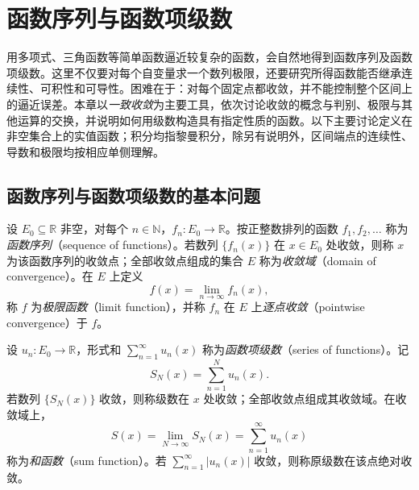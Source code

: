 \setcounter{chapter}{9} %
\chapter{函数序列与函数项级数}
\label{chap:function-sequences-and-series}

用多项式、三角函数等简单函数逼近较复杂的函数，会自然地得到函数序列及函数项级数。这里不仅要对每个自变量求一个数列极限，还要研究所得函数能否继承连续性、可积性和可导性。困难在于：对每个固定点都收敛，并不能控制整个区间上的逼近误差。本章以\emph{一致收敛}为主要工具，依次讨论收敛的概念与判别、极限与其他运算的交换，并说明如何用级数构造具有指定性质的函数。以下主要讨论定义在非空集合上的实值函数；积分均指黎曼积分，除另有说明外，区间端点的连续性、导数和极限均按相应单侧理解。

\section{函数序列与函数项级数的基本问题}
\label{sec:basic-problems-of-function-sequences-and-series}

\begin{definition}
\label{def:pointwise-function-sequence-convergence}
设 $E_0\subseteq\mathbb R$ 非空，对每个 $n\in\mathbb N$，$f_n:E_0\to\mathbb R$。按正整数排列的函数 $f_1,f_2,\ldots$ 称为\emph{函数序列}（sequence of functions）。若数列 $\{f_n(x)\}$ 在 $x\in E_0$ 处收敛，则称 $x$ 为该函数序列的收敛点；全部收敛点组成的集合 $E$ 称为\emph{收敛域}（domain of convergence）。在 $E$ 上定义
\[
    f(x)=\lim_{n\to\infty}f_n(x),
\]
称 $f$ 为\emph{极限函数}（limit function），并称 $f_n$ 在 $E$ 上\emph{逐点收敛}（pointwise convergence）于 $f$。
\end{definition}

\begin{definition}
\label{def:function-series-and-sum-function}
设 $u_n:E_0\to\mathbb R$，形式和 $\sum_{n=1}^\infty u_n(x)$ 称为\emph{函数项级数}（series of functions）。记
\[
    S_N(x)=\sum_{n=1}^N u_n(x).
\]
若数列 $\{S_N(x)\}$ 收敛，则称级数在 $x$ 处收敛；全部收敛点组成其收敛域。在收敛域上，
\[
    S(x)=\lim_{N\to\infty}S_N(x)=\sum_{n=1}^\infty u_n(x)
\]
称为\emph{和函数}（sum function）。若 $\sum_{n=1}^\infty|u_n(x)|$ 收敛，则称原级数在该点绝对收敛。
\end{definition}

